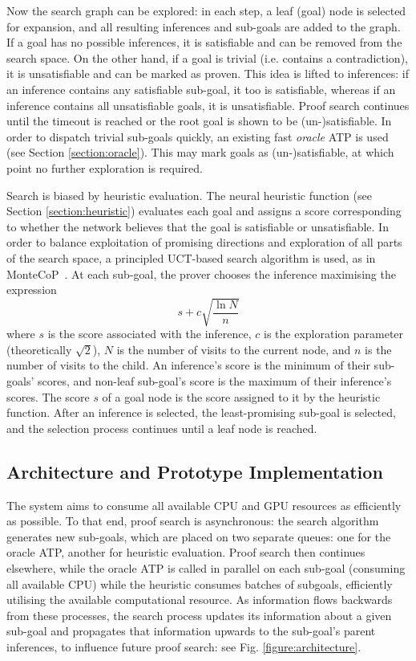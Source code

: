 \documentclass{llncs}
\begin{document}
Now the search graph can be explored: in each step, a leaf (goal) node is selected for expansion, and all resulting inferences and sub-goals are added to the graph.
If a goal has no possible inferences, it is satisfiable and can be removed from the search space.
On the other hand, if a goal is trivial (i.e. contains a contradiction), it is unsatisfiable and can be marked as proven.
This idea is lifted to inferences: if an inference contains any satisfiable sub-goal, it too is satisfiable, whereas if an inference contains all unsatisfiable goals, it is unsatisfiable.
Proof search continues until the timeout is reached or the root goal is shown to be (un-)satisfiable.
In order to dispatch trivial sub-goals quickly, an existing fast \emph{oracle} ATP is used (see Section \ref{section:oracle}).
This may mark goals as (un-)satisfiable, at which point no further exploration is required.

Search is biased by heuristic evaluation.
The neural heuristic function (see Section \ref{section:heuristic}) evaluates each goal and assigns a score corresponding to whether the network believes that the goal is satisfiable or unsatisfiable.
In order to balance exploitation of promising directions and exploration of all parts of the search space, a principled UCT-based search algorithm is used, as in MonteCoP~\cite{MonteCoP}.
At each sub-goal, the prover chooses the inference maximising the expression
\[
	s + c\sqrt{\frac{\ln N}{n}}
\]
where \(s\) is the score associated with the inference, \(c\) is the exploration parameter (theoretically \(\sqrt{2}\)), \(N\) is the number of visits to the current node, and \(n\) is the number of visits to the child. An inference's score is the minimum of their sub-goals' scores, and non-leaf sub-goal's score is the maximum of their inference's scores. The score \(s\) of a goal node is the score assigned to it by the heuristic function. After an inference is selected, the least-promising sub-goal is selected, and the selection process continues until a leaf node is reached.


\subsection{Architecture and Prototype Implementation}
The system aims to consume all available CPU and GPU resources as efficiently as possible.
To that end, proof search is asynchronous: the search algorithm generates new sub-goals, which are placed on two separate queues: one for the oracle ATP, another for heuristic evaluation.
Proof search then continues elsewhere, while the oracle ATP is called in parallel on each sub-goal (consuming all available CPU) while the heuristic consumes batches of subgoals, efficiently utilising the available computational resource.
As information flows backwards from these processes, the search process updates its information about a given sub-goal and propagates that information upwards to the sub-goal's parent inferences, to influence future proof search: see Fig. \ref{figure:architecture}.
\end{document}
